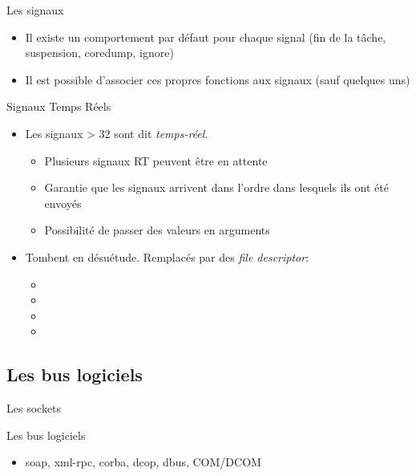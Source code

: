\begin{frame}[fragile=singleslide]{Les signaux}
\begin{itemize}
\begin{columns}
      \begin{column}{3cm}
        \begin{itemize} 
        \item 25: XFSZ
        \item 26: VTALRM
        \item 27: PROF
        \item 28: WINCH
        \item 29: POLL
        \item 30: PWR
        \item 31: SYS
        \end{itemize}
      \end{column}
    \end{columns}
    \vspace{2ex}
  \item Il existe  un comportement par défaut pour  chaque signal (fin
    de la tâche, suspension, coredump, ignore)
  \item Il  est possible d'associer ces propres  fonctions aux signaux
    (sauf quelques uns)
  \end{itemize}
\end{frame}

\begin{frame}[fragile=singleslide]{Signaux Temps Réels}
\begin{itemize} 
\item Les signaux > 32 sont dit \emph{temps-réel}.
    \begin{itemize}
    \item Plusieurs signaux RT peuvent être en attente
    \item Garantie que les signaux arrivent dans l'ordre dans lesquels
      ils ont été envoyés
    \item Possibilité de passer des valeurs en arguments
    \end{itemize} 
  \item Tombent en désuétude. Remplacés par des \emph{file descriptor}:
    \begin{itemize} 
    \item {}
    \item {}
    \item {}
    \item {}
    \end{itemize}  
  \end{itemize} 
\end{frame}

\subsection{Les bus logiciels}

\begin{frame}[fragile=singleslide]{Les sockets}
\end{frame} 

\begin{frame}[fragile=singleslide]{Les bus logiciels}
  \begin{itemize}  
    \item soap, xml-rpc, corba, dcop, dbus, COM/DCOM
  \end{itemize} 
\end{frame} 



